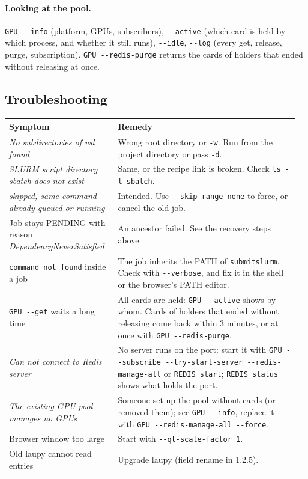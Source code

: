 \documentclass[11pt,a4paper]{article}
\newcommand{\cmd}[1]{\texttt{#1}}
\begin{document}
\paragraph{Looking at the pool.}
\cmd{GPU -{}-info} (platform, GPUs, subscribers), \cmd{-{}-active} (which card is held by which
process, and whether it still runs), \cmd{-{}-idle}, \cmd{-{}-log} (every get, release, purge,
subscription). \cmd{GPU -{}-redis-purge} returns the cards of holders that ended without releasing
at once.

\subsection{Troubleshooting}

\begin{longtable}{@{}>{\raggedright}p{0.36\linewidth}>{\raggedright\arraybackslash}p{0.6\linewidth}@{}}
\toprule
Symptom & Remedy \\
\midrule
\endhead
\emph{No subdirectories of wd found} & Wrong root directory or \cmd{-w}. Run from the project directory or pass \cmd{-d}. \\
\emph{SLURM script directory sbatch does not exist} & Same, or the recipe link is broken. Check \cmd{ls -l sbatch}. \\
\emph{skipped, same command already queued or running} & Intended. Use \cmd{-{}-skip-range none} to force, or cancel the old job. \\
Job stays PENDING with reason \emph{DependencyNeverSatisfied} & An ancestor failed. See the recovery steps above. \\
\cmd{command not found} inside a job & The job inherits the PATH of \cmd{submitslurm}. Check with \cmd{-{}-verbose}, and fix it in the shell or the browser's PATH editor. \\
\cmd{GPU -{}-get} waits a long time & All cards are held: \cmd{GPU -{}-active} shows by whom. Cards of holders that ended without releasing come back within 3 minutes, or at once with \cmd{GPU -{}-redis-purge}. \\
\emph{Can not connect to Redis server} & No server runs on the port: start it with \cmd{GPU -{}-subscribe -{}-try-start-server -{}-redis-manage-all} or \cmd{REDIS start}; \cmd{REDIS status} shows what holds the port. \\
\emph{The existing GPU pool manages no GPUs} & Someone set up the pool without cards (or removed them); see \cmd{GPU -{}-info}, replace it with \cmd{GPU -{}-redis-manage-all -{}-force}. \\
Browser window too large & Start with \cmd{-{}-qt-scale-factor 1}. \\
Old laupy cannot read entries & Upgrade laupy (field rename in 1.2.5). \\
\bottomrule
\end{longtable}
\end{document}
